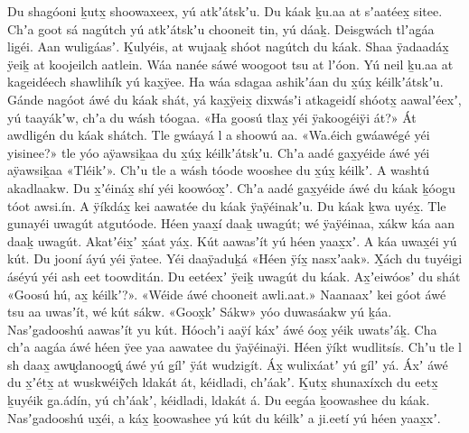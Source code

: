 \clearpage
\begin{pairs}
\begin{Leftside}
\beginnumbering
\pstart
\noindent
{}Du shagóoni ḵutx̱ shoowaxeex, yú atkʼátskʼu.
Du káak ḵu.aa at sʼaatéex̱ sitee.
Chʼa goot sá nagútch yú atkʼátskʼu chooneit tin, yú dáaḵ.
Deisgwách tlʼag̱áa ligéi.
Aan wuligáasʼ.
Ḵul\-yéis, at wujaaḵ shóot nagútch du káak.
Shaa ÿadaadáx̱ ÿeiḵ at koojeilch aatlein.
\pend
\pstart
{}Wáa nanée sáwé woogoot tsu at lʼóon.
Yú neil ḵu.aa at kageidéech shawlihík yú kax̱ÿee.
Ha wáa sdagaa ashikʼáan du x̱úx̱ kéilkʼátskʼu.
Gánde nagóot áwé du káak shát, yá kax̱ÿeix̱ dixwásʼi atkageidí shóotx̱ aawalʼéexʼ, yú taayákʼw, chʼa du wásh tóog̱aa.
«\!Ha goosú tlax̱ yéi ÿakoo\-géiÿi át?\!»
Át awdlig̱én du káak shátch.
Tle gwáayá l a shoowú aa.
«\!Wa.éich gwáawégé yéi yisinee?\!»
tle yóo aÿawsiḵaa du x̱úx̱ kéil\-kʼátskʼu.
Chʼa aadé g̱ax̱yéide áwé yéi aÿawsiḵaa «\!Tléikʼ\!».
Chʼu tle a wásh tóode wooshee du x̱úx̱ kéilkʼ.
A washtú akadlaakw.
Du x̱ʼéináx̱ shí yéi koowóox̱ʼ.
Chʼa aadé g̱ax̱yéide áwé du káak ḵóogu tóot awsi.ín.
A ÿíkdáx̱ kei aawatée du káak ÿaÿéinakʼu.
Du káak ḵwa uyéx̱.
\pend
\pstart
{}Tle g̱unayéi uwagút atgutóode.
Héen yaax̱í daaḵ uwagút;
wé ÿaÿéinaa, xákw káa aan daaḵ uwagút.
Akatʼéix̱ʼ x̱áat yáx̱.
Kút aawasʼít yú héen yaax̱xʼ.
A káa uwax̱éi yú kút.
Du jooní áyú yéi ÿatee.
Yéi daaÿaduḵá «\!Héen ÿíx̱ nasxʼaak\!».
X̱ách du tuyéigi áséyú yéi ash eet toowditán.
\pend
\pstart
{}Du eetéexʼ ÿeiḵ uwagút du káak.
Ax̱ʼeiwóosʼ du shát «\!Goosú hú, ax̱ kéilkʼ?\!».
«\!Wéi\-de áwé chooneit awli.aat.\!»
\pend
\pstart
{}Naanaaxʼ kei góot áwé tsu aa uwasʼít, wé kút sákw.
«\!Goox̱kʼ Sákw\!» yóo duwasáakw yú ḵáa.
Nasʼgadooshú aawasʼít yu kút.\linebreak
{}Hóochʼi aaÿí káxʼ áwé óox̱ yéik uwatsʼáḵ.
Cha chʼa aag̱áa áwé héen ÿee yaa aawatee du ÿaÿéinaÿi.
Héen ÿíkt wudlitsís.
Chʼu tle l sh daax̱ awu̬danoogú̥ áwé yú g̱ílʼ ÿát wudzigít.
Áx̱ wulixáatʼ yú g̱ílʼ yá.
Áxʼ áwé du x̱ʼétx̱ at wuskwéiÿ̃ch ldakát át, kéi\-dladi, chʼáakʼ.
Ḵutx̱ shunaxíxch du eetx̱ ḵuyéik g̱a.ádín, yú chʼáakʼ, kéidladi, ldakát á.
\pend
\pstart
{}Du eeg̱áa ḵoowashee du káak.
Nasʼga\-dooshú ux̱éi, a káx̱ ḵoowashee yú kút du kéilkʼ a ji.eetí yú héen yaax̱xʼ.

\end{Leftside}
\end{pairs}
